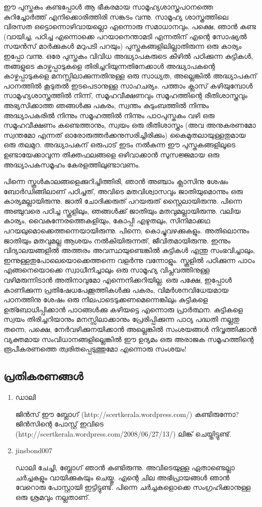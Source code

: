 ഈ പുസ്തകം കണ്ടപ്പോള്‍ ആ ഭീകരമായ സാമൂഹ്യശാസ്ത്രപഠനത്തെ കുറിച്ചോര്‍ത്ത് എനിക്കൊരിത്തിരി സങ്കടം വന്നു. സാമൂഹ്യ ശാസ്ത്രത്തിലെ വിരസത ഒട്ടൊന്നൊഴിവായല്ലൊ 
എന്നൊരു സമാധാനവും. പക്ഷെ, ഞാന്‍ കണ്ട (വായിച്ച, പഠിച്ച എന്നൊക്കെ പറയാനെന്താമടി എന്നതിന് എന്റെ സോഷ്യല്‍ സയന്‍സ് മാര്‍ക്കുകള്‍ മറുപടി പറയും) 
പുസ്തകങ്ങളിലില്ലാതിരുന്ന ഒരു കാര്യം ഇപ്പോ വന്നു. ഒരേ പുസ്തകം വിവിധ അദ്ധ്യാപകരുടെ കീഴില്‍ പഠിക്കുന്ന കുട്ടികള്‍, തങ്ങളുടെ കാഴ്വപ്പാടുകളെ തിരിച്ചറിയുന്നതിനേക്കാള്‍ 
അദ്ധ്യാപകന്റെ കാഴ്ചപ്പാടുകളെ മനസ്സിലാക്കുന്നതിനുള്ള ഒരു സാധ്യത, അല്ലെങ്കില്‍ അദ്ധ്യാപകന് പഠനത്തില്‍ കൂടുതല്‍ ഇടപെടാനുള്ള സാഹചര്യം. പത്താം ക്ലാസ് 
കഴിയുമ്പോള്‍ സാമൂഹ്യശാസ്ത്രത്തില്‍ നിന്ന്, സമൂഹവീക്ഷണവും സമൂഹത്തിന്റെ രീതിശാസ്ത്രവും അഭ്യസിക്കാത്ത ഞങ്ങള്‍ക്കു പകരം, സ്വന്തം കുടുംബത്തില്‍ നിന്നും 
അദ്ധ്യാപകരില്‍ നിന്നും സമൂഹത്തില്‍ നിന്നും പാഠപുസ്തകം വഴി ഒരു സമൂഹവീക്ഷണം കണ്ടെത്താനും, സ്വയം ഒരു രീതിശാസ്ത്രം (അവ അനുകരണമോ സ്വന്തമോ എന്നത് 
ഓരോരുത്തര്‍ക്കനുസരിച്ചിരിക്കും) കൈമുതലായുള്ളതുമായ ഒരു തലമുറ. അദ്ധ്യാപകന് ഒരുപാട് ഇടം നല്‍കുന്ന ഈ പുസ്തകങ്ങളിലൂടെ ഉണ്ടായേക്കാവുന്ന 
തിക്തഫലങ്ങളെ ഒഴിവാക്കാന്‍ സുസജ്ജമായ ഒരു അദ്ധ്യാപകസമൂഹം കേരളത്തിലുണ്ടാവണം.

പിന്നെ സ്കൂള്‍കാലങ്ങളെക്കുറിച്ചിത്തിരി, ഞാന്‍ അഞ്ചാം ക്ലാസിനു ശേഷം ബോര്‍ഡിങ്ങിലാണ് പഠിച്ചത്, അവിടെ മതവിശ്വാസവും ജാതിയുമൊന്നും ഒരു കാര്യമല്ലായിരുന്നു. 
ജാതി ചോദിക്കരുത് പറയരുത് സ്റ്റൈലായിരുന്നു. പിന്നെ അഞ്ചുവരെ പഠിച്ച സ്കൂളിലും, ഞങ്ങള്‍ക്ക് ജാതിയും മതവുമല്ലായിരുന്നു. വലിയ കാര്യം, വൈകുന്നേരത്തെകളിയും, 
കോപ്പി എഴുതലും, സിനിമാക്കഥ പറയലുമൊക്കെത്തന്നെയായിരുന്നു. പിന്നെ, കൊച്ചുവഴക്കുകളും. അതിലൊന്നും ജാതിയും മതവുമല്ല ആശയം നല്‍കിയിരുന്നത്, ജീവിതമായിരുന്നു. 
ഇന്നും വിദ്യാലയങ്ങളില്‍ അത്തരം അവസ്ഥയുണ്ടെങ്കില്‍ കുട്ടികള്‍ എന്തു സംഭവിച്ചാലും, ഇന്നുള്ളതുപോലെയൊക്കെത്തന്നെ വളര്‍ന്നു വന്നോളും. സ്കൂളില്‍ പഠിക്കുന്ന പാഠം 
എങ്ങനെയൊക്കെ സ്വാധീനിച്ചാലും ഒരു സാമൂഹ്യ വിപ്ലവത്തിനുള്ള വഴിമരുന്നിടാന്‍ അതിനാവുമോ എന്നെനിക്കറിയില്ല. ഒരു പക്ഷേ, ഇപ്പോള്‍ കാണിക്കുന്ന 
പ്രതിഷേധപേക്കൂത്തികള്‍ക്കു പകരം, വിമര്‍ശനവിധേയമായ പഠനത്തിനു ശേഷം ഒരു നിലപാടെടുക്കണമെന്നെങ്കിലും കുട്ടികളെ ഉത്ബോധിപ്പിക്കാന്‍ പാഠങ്ങള്‍ക്കു കഴിയട്ടെ 
എന്നൊരു പ്രാര്‍ത്ഥന. കുട്ടികളെ സ്വയം തിരിച്ചറിയാനും മനസ്സിലാക്കാനും പ്രേരിപ്പിക്കുന്ന പാഠ്യ പദ്ധതി നല്ലതു തന്നെ, പക്ഷെ, നേര്‍വഴിക്കുനയിക്കാന്‍ അല്ലെങ്കില്‍ 
സംശയങ്ങള്‍ നിവൃത്തിക്കാന്‍ വ്യക്തമായ സംവിധാനങ്ങളില്ലെങ്കില്‍ ഈ ഉദ്യമം ഒരു അരാജക സമൂഹത്തിന്റെ രൂപീകരണത്തെ ത്വരിതപ്പെടുത്തുമോ എന്നൊരു സംശയം!

\subsection*{പ്രതികരണങ്ങള്‍}

\begin{enumerate}
 \item{ഡാലി}

ജിന്‍സ് ഈ ബ്ലോഗ് (http://scertkerala.wordpress.com/) കണ്ടിരുന്നോ?  ജിന്‍സിന്റെ പോസ്റ്റ് 
ഇവിടെ (http://scertkerala.wordpress.com/2008/06/27/13/) ലിങ്ക് ചെയ്തിട്ടുണ്ട്.
\item{jinsbond007}

ഡാലി ചേച്ചി, ബ്ലോഗ് ഞാന്‍ കണ്ടിരുന്നു. അവിടെയുള്ള ഏതാണ്ടെല്ലാ ചര്‍ച്ചകളും വായിക്കുകയും ചെയ്തു. 
എന്റെ ചില അഭിപ്രായങ്ങള്‍ ഞാന്‍ വേറൊരു പോസ്റ്റായി ഇട്ടിട്ടുണ്ട്. പിന്നെ ചര്‍ച്ചകളൊക്കെ സംഗ്രഹിക്കാനുള്ള 
ഒരു ശ്രമവും നല്ലതാണ്.

\end{enumerate}

\newpage
